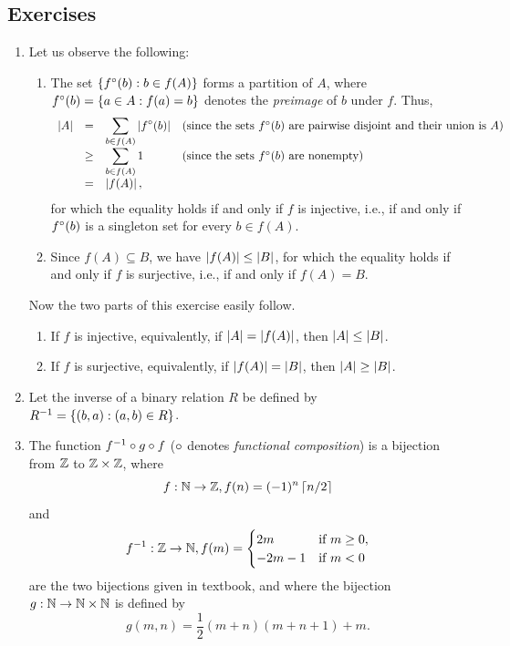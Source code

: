 \subsection*{Exercises}
\begin{enumerate}[\thesection-1]
%
\item Let us observe the following:
\begin{enumerate}[(1)]
\item The set $\left\{f^\circ(b) : b \in f(A)\right\}$ forms a partition of $A$, where $f^\circ(b) = \left\{a \in A : f(a) = b\right\}$ denotes the \emph{preimage} of $b$ under $f$. Thus,
\[
\begin{array}{llll}
\card{A} & =    & \ds{\sum\limits_{b \in f(A)} \card{\preimage{f}(b)}} & \mathtext{(since the sets \mathmode{\preimage{f}(b)} are pairwise disjoint and their union is \mathmode{A})} \cr
         & \geq & \ds{\sum\limits_{b \in f(A)} 1} & \mathtext{(since the sets \mathmode{\preimage{f}(b)} are nonempty)} \cr
         & =    & \card{f(A)}, & \cr
\end{array}
\]
for which the equality holds if and only if $f$ is injective, i.e., if and only if $f^\circ(b)$ is a singleton set for every $b \in f(A)$.
\item Since $f(A) \subseteq B$, we have $\left|f(A)\right| \leq \left|B\right|$, for which the equality holds if and only if $f$ is surjective, i.e., if and only if $f(A) = B$.
\end{enumerate}
Now the two parts of this exercise easily follow.
\begin{enumerate}[\it a.]
\item If $f$ is injective, equivalently, if $\left|A\right| = \left|f(A)\right|$, then $\left|A\right| \leq \left|B\right|$.
\item If $f$ is surjective, equivalently, if $\left|f(A)\right| = \left|B\right|$, then $\left|A\right| \geq \left|B\right|$.
\end{enumerate}
%
\setcounter{enumi}{2}
%
\item Let the inverse of a binary relation $R$ be defined by $R^{-1} = \left\{(b, a) : (a, b) \in R\right\}$.
%
\item The function $f^{-1} \mathbin{\circ} g \mathbin{\circ} f$ ($\mathbin{\circ}$ denotes \emph{functional composition}) is a bijection from $\mathbb{Z}$ to $\mathbb{Z} \times \mathbb{Z}$, where
\[
f: \mathbb{N} \to \mathbb{Z}, f(n) = (-1)^n \left\lceil n/2\right\rceil
\]
and
\[
\inv{f}: \zah \to \nat, f(m) =
\begin{cases}
2m      & \mathtext{if \mathmode{m \geq 0}}, \cr
-2m - 1 & \mathtext{if \mathmode{m < 0}} \cr
\end{cases}
\]
are the two bijections given in textbook, and where the bijection $g : \mathbb{N} \to \mathbb{N} \times \mathbb{N}$ is defined by
\[
g(m, n) = \frac{1}{2}(m + n)(m + n + 1) + m.
\]
%
\end{enumerate}

